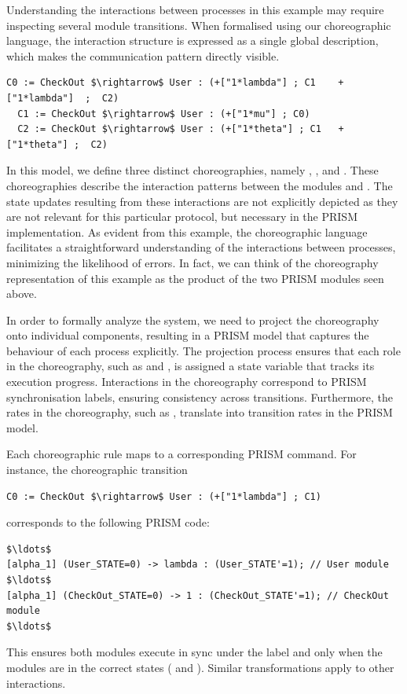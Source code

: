 Understanding the interactions between processes in this example may require inspecting 
several module transitions. 
When formalised using our choreographic language, 
the interaction structure is expressed as a single global description, 
which makes the communication pattern directly visible.
\begin{lstlisting}[style=chor-color,% caption={Example of Listing \ref{example1} in our choreographic language},captionpos=b,
  frame=none, label={lst:chorexample}]
  C0 := CheckOut $\rightarrow$ User : (+["1*lambda"] ; C1	 +["1*lambda"]  ;  C2)
  C1 := CheckOut $\rightarrow$ User : (+["1*mu"] ; C0)  
  C2 := CheckOut $\rightarrow$ User : (+["1*theta"] ; C1   +["1*theta"] ;  C2)
\end{lstlisting}
In this model, we define three distinct choreographies, namely
, , and . These choreographies
describe the interaction patterns between the modules 
and . The state updates resulting from these
interactions are not explicitly depicted as they are not relevant for
this particular protocol, but necessary in the PRISM implementation.
As evident from this example, the choreographic language facilitates a
straightforward understanding of the interactions between processes,
minimizing the likelihood of errors. In fact, we can think of the
choreography representation of this example as the product of the two
PRISM modules seen above.


In order to formally analyze the system, we need to project the
choreography onto individual components, resulting in a PRISM model
that captures the behaviour of each process explicitly. The projection
process ensures that each role in the choreography, such as
 and , is assigned a state variable
that tracks its execution progress. Interactions in the choreography
correspond to PRISM synchronisation labels, ensuring consistency
across transitions. Furthermore, the rates in the choreography, such
as ,
translate into transition rates in the PRISM model.

Each choreographic rule maps to a corresponding PRISM command. For instance, the choreographic transition 
\begin{lstlisting}[style=chor-color,frame=none,escapechar=|]
C0 := CheckOut $\rightarrow$ User : (+["1*lambda"] ; C1)
\end{lstlisting}
corresponds to the following PRISM code:
\begin{lstlisting}[style=prism-color,frame=none,escapechar=|]
$\ldots$
[alpha_1] (User_STATE=0) -> lambda : (User_STATE'=1); // User module
$\ldots$
[alpha_1] (CheckOut_STATE=0) -> 1 : (CheckOut_STATE'=1); // CheckOut module
$\ldots$
\end{lstlisting}
 This ensures both modules execute in sync under the label  and only when the modules are in the correct states ( and ). Similar transformations apply to other interactions.



